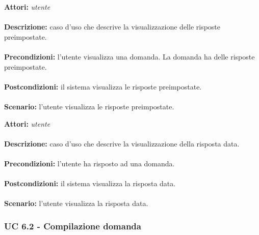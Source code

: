 \documentclass[a4paper,11pt]{article}
\begin{document}

\textbf{Attori:} \textit{utente}
\\ \\
\textbf{Descrizione:} caso d'uso che descrive la visualizzazione delle risposte preimpostate.\\
\\
\textbf{Precondizioni:} l'utente visualizza una domanda. La domanda ha delle risposte preimpostate.\\
\\
\textbf{Postcondizioni:} il sistema visualizza le risposte preimpostate.\\
\\
\textbf{Scenario:} l’utente visualizza le risposte preimpostate.\\



\textbf{Attori:} \textit{utente}
\\ \\
\textbf{Descrizione:} caso d'uso che descrive la visualizzazione della risposta data.\\
\\
\textbf{Precondizioni:} l'utente ha risposto ad una domanda.\\
\\
\textbf{Postcondizioni:} il sistema visualizza la risposta data.\\
\\
\textbf{Scenario:} l’utente visualizza la risposta data.\\


\newpage
\subsubsection{UC 6.2 - Compilazione domanda}
\end{document}
